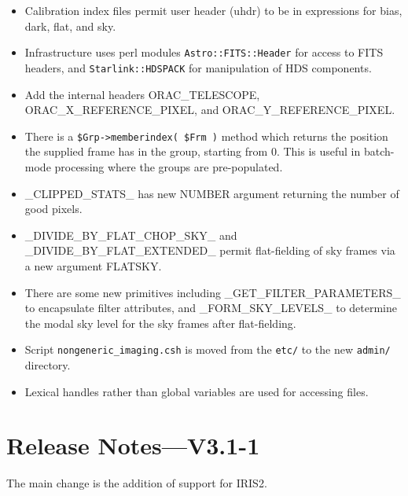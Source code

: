 \documentclass[twoside,11pt,nolof]{starlink}
\begin{document}
\begin{itemize}
   \item Calibration index files permit user header (uhdr) to be in
   expressions for bias, dark, flat, and sky.

   \item Infrastructure uses perl modules \texttt{Astro::FITS::Header} for access
   to FITS headers, and \texttt{Starlink::HDSPACK} for manipulation of HDS components.

   \item Add the internal headers ORAC\_TELESCOPE,
   ORAC\_X\_REFERENCE\_PIXEL, and ORAC\_Y\_REFERENCE\_PIXEL.

   \item There is a {\tt\$Grp->memberindex( \$Frm )} method which returns
   the position the supplied frame has in the group, starting from 0.
   This is useful in batch-mode processing where the groups are pre-populated.

   \item \_CLIPPED\_STATS\_ has new NUMBER argument returning the
   number of good pixels.

   \item \_DIVIDE\_BY\_FLAT\_CHOP\_SKY\_ and \_DIVIDE\_BY\_FLAT\_EXTENDED\_
   permit flat-fielding of sky frames via a new argument FLATSKY.

   \item There are some new primitives including \_GET\_FILTER\_PARAMETERS\_ to
   encapsulate filter attributes, and \_FORM\_SKY\_LEVELS\_ to
   determine the modal sky level for the sky frames after flat-fielding.

   \item Script \texttt{nongeneric\_imaging.csh} is moved from the \texttt{etc/} to the
   new \texttt{admin/} directory.

   \item Lexical handles rather than global variables are used for accessing files.

\end{itemize}


\section{Release Notes---V3.1-1\label{se_changes3p1}}

The main change is the addition of support for IRIS2.
\end{document}

